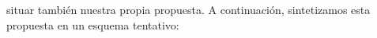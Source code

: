 situar también nuestra propia propuesta. A continuación, sintetizamos esta propuesta en un esquema tentativo:
%
%
%
%
%
